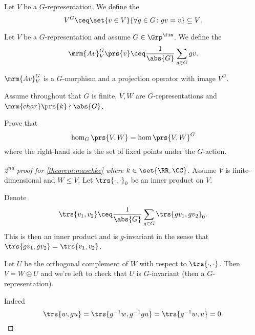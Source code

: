 \documentclass[10pt,a4paper,twoside,openany,hidelinks]{book}
\begin{document}
\begin{definition}
Let $V$ be a $G$-representation. We define the 
\[V^G \ceq \set{v \in V}{\forall g \in G \colon gv = v} \subseteq V \text{.}\]
\end{definition}

\begin{definition}
Let $V$ be a $G$-representation and assume $G \in \Grp^\fin$. We define the 
\[\mrm{Av}_V^G \prs{v} \ceq \frac{1}{\abs{G}} \sum_{g \in G} gv \text{.}\]
\end{definition}

\begin{remark}
$\mrm{Av}_V^G$ is a $G$-morphism and a projection operator with image $V^G$.
\end{remark}

Assume throughout that $G$ is finite, $V,W$ are $G$-representations and $\mrm{char}\prs{k} \nmid \abs{G}$.

\begin{exercise}
Prove that
\[\hom_G\prs{V,W} = \hom\prs{V,W}^G\]
where the right-hand side is the set of fixed points under the $G$-action.
\end{exercise}

\begin{proof}[2\textsuperscript{nd} proof for \ref{theorem:maschke} where $k \in \set{\RR,\CC}$]

Assume $V$ is finite-dimensional and $W \leq V$.
Let $\trs{\cdot,\cdot}_0$ be an inner product on $V$.

Denote
\[\trs{v_1, v_2} \ceq \frac{1}{\abs{G}} \sum_{g \in G} \trs{g v_1, g v_2}_0 \text{.}\]
This is then an inner product and is $g$-invariant in the sense that $\trs{g v_1, g v_2} = \trs{v_1, v_2}$.

Let $U$ be the orthogonal complement of $W$ with respect to $\trs{\cdot , \cdot}$.
Then $V = W \oplus U$ and we're left to check that $U$ is $G$-invariant (then a $G$-representation).

Indeed
\[\trs{w, gu} = \trs{g^{-1}w, g^{-1} g u} = \trs{g^{-1}w, u} = 0 \text{.}\]
\end{proof}
\end{document}
